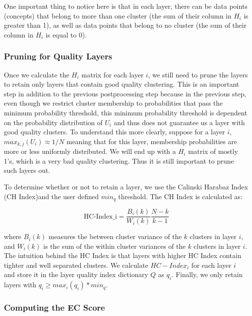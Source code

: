 One important thing to notice here is that in each layer, there can be data points (concepts) that belong to more than one cluster (the sum of their column in $H_{i}$ is greater than 1), as well as data points that belong to no cluster (the sum of their column in $H_{i}$ is equal to 0).

\subsubsection{Pruning for Quality Layers}\label{pruning_layers}
Once we calculate the $H_{i}$ matrix for each layer $i$, we still need to prune the layers to retain only layers that contain good quality clustering. This is an important step in addition to the previous postprocessing step because in the previous step, even though we restrict cluster membership to probabilities that pass the minimum probability threshold, this minimum probability threshold is dependent on the probability distribution of $U_{i}$ and thus does not guarantee us a layer with good quality clusters. To understand this more clearly, suppose for a layer $i$, $max_{k,j}(U_{i}) \approx 1/N$ meaning that for this layer, membership probabilities are more or less uniformly distributed. We will end up with a $H_{i}$ matrix of mostly 1's, which is a very bad quality clustering. Thus it is still important to prune such layers out.

To determine whether or not to retain a layer, we use the Calinski Harabaz Index (CH Index)and the user defined $min_q$ threshold. The CH Index is calculated as:

\begin{equation}
\text{HC-Index_{i}} = \frac{B_{i}(k)}{W_{i}(k)}\frac{N-k}{k-1}
\end{equation}

where $B_{i}(k)$ measures the between cluster variance of the $k$ clusters in layer $i$, and $W_{i}(k)$ is the sum of the within cluster variances of the $k$ clusters in layer $i$. The intuition behind the HC Index is that layers with higher HC Index contain tighter and well separated clusters.
We calculate $HC-Index_{i}$ for each layer $i$ and store it in the layer quality index dictionary $Q$ as $q_{i}$. Finally, we only retain layers with $q_{i} \geq max_{i}(q_{i}) * min_q$.

\subsubsection{Computing the EC Score}\label{calc_ec}

